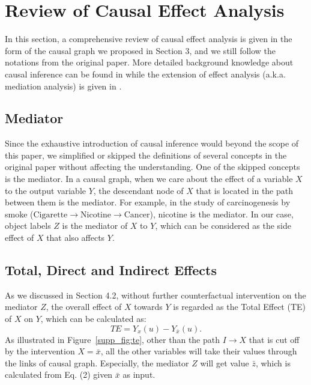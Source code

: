 \documentclass[10pt,twocolumn,letterpaper]{article}
\begin{document}
\clearpage
\appendix
\begin{abstract}
This supplementary document is organized as follows: 1) section~\ref{sec:review}: a comprehensive review of causal effect analysis in causal inference; 2) section~\ref{sec:networks}: more details of the simplified network structures in the original paper; 3) section~\ref{sec:quantitative}: more quantitative studies; 4) section~\ref{sec:qualitative}: more qualitative studies.
\end{abstract}

\section{Review of Causal Effect Analysis}
\label{sec:review}
In this section, a comprehensive review of causal effect analysis is given in the form of the causal graph we proposed in Section 3, and we still follow the notations from the original paper. More detailed background knowledge about causal inference can be found in \cite{pearl2016causal, Judea2018thebookofwhy} while the extension of effect analysis (a.k.a. mediation analysis) is given in \cite{robins1992identifiability, pearl2001direct, vanderweele2013three, vanderweele2015explanation}. 

\subsection{Mediator}
Since the exhaustive introduction of causal inference would beyond the scope of this paper, we simplified or skipped the definitions of several concepts in the original paper without affecting the understanding. One of the skipped concepts is the mediator. In a causal graph, when we care about the effect of a variable $X$ to the output variable $Y$, the descendant node of $X$ that is located in the path between them is the mediator. For example, in the study of carcinogenesis by smoke ($\text{Cigarette}\to \text{Nicotine}\to \text{Cancer}$), nicotine is the mediator. In our case, object labels $Z$ is the mediator of $X$ to $Y$, which can be considered as the side effect of $X$ that also affects $Y$. 

\subsection{Total, Direct and Indirect Effects}
As we discussed in Section 4.2, without further counterfactual intervention on the mediator $Z$, the overall effect of $X$ towards $Y$ is regarded as the Total Effect (TE) of $X$ on $Y$, which can be calculated as:
\begin{equation}
    TE=Y_x(u) - Y_{\bar{x}}(u). 
\end{equation}
As illustrated in Figure~\ref{supp_fig:te}, other than the path $I\to X$ that is cut off by the intervention $X=\bar{x}$, all the other variables will take their values through the links of causal graph. Especially, the mediator $Z$ will get value $\bar{z}$, which is calculated from Eq. (2) given $\bar{x}$ as input.
\end{document}
